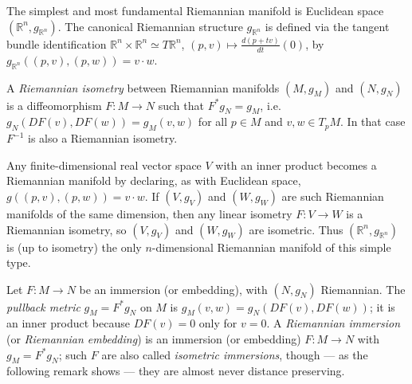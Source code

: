 \begin{example}
  \label{ex:pet-ch1-euclidean-space}
  \leanok
  The simplest and most fundamental Riemannian manifold is Euclidean space
  $(\mathbb{R}^n,g_{\mathbb{R}^n})$. The canonical Riemannian structure $g_{\mathbb{R}^n}$ is
  defined via the tangent bundle identification $\mathbb{R}^n\times\mathbb{R}^n\simeq
  T\mathbb{R}^n$, $(p,v)\mapsto\frac{d(p+tv)}{dt}(0)$, by
  $g_{\mathbb{R}^n}((p,v),(p,w))=v\cdot w$.
\end{example}

\begin{definition}
  \label{def:pet-ch1-riemannian-isometry}
  \leanok
  A \emph{Riemannian isometry} between Riemannian manifolds $(M,g_M)$ and
  $(N,g_N)$ is a diffeomorphism $F:M\to N$ such that $F^*g_N=g_M$, i.e.
  $g_N(DF(v),DF(w))=g_M(v,w)$ for all $p\in M$ and $v,w\in T_pM$. In that case
  $F^{-1}$ is also a Riemannian isometry.
\end{definition}

\begin{example}
  \label{ex:pet-ch1-inner-product-space}
  \leanok
  Any finite-dimensional real vector space $V$ with an inner product becomes a
  Riemannian manifold by declaring, as with Euclidean space,
  $g((p,v),(p,w))=v\cdot w$. If $(V,g_V)$ and $(W,g_W)$ are such Riemannian
  manifolds of the same dimension, then any linear isometry $F:V\to W$ is a
  Riemannian isometry, so $(V,g_V)$ and $(W,g_W)$ are isometric. Thus
  $(\mathbb{R}^n,g_{\mathbb{R}^n})$ is (up to isometry) the only $n$-dimensional
  Riemannian manifold of this simple type.
\end{example}

\begin{definition}
  \label{def:pet-ch1-pullback-metric}
  \leanok
  Let $F:M\to N$ be an immersion (or embedding), with $(N,g_N)$ Riemannian. The
  \emph{pullback metric} $g_M=F^*g_N$ on $M$ is $g_M(v,w)=g_N(DF(v),DF(w))$; it
  is an inner product because $DF(v)=0$ only for $v=0$. A \emph{Riemannian
  immersion} (or \emph{Riemannian embedding}) is an immersion (or embedding)
  $F:M\to N$ with $g_M=F^*g_N$; such $F$ are also called \emph{isometric
  immersions}, though — as the following remark shows — they are almost never
  distance preserving.
\end{definition}

